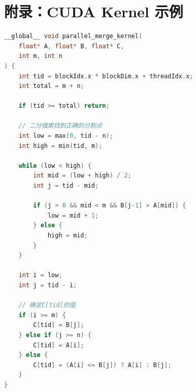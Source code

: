 \documentclass[12pt, a4paper]{ctexart}
\begin{document}
\appendix
\section{附录：CUDA Kernel 示例}

\begin{lstlisting}[language=C, caption={并行合并的 CUDA Kernel}]
__global__ void parallel_merge_kernel(
    float* A, float* B, float* C,
    int m, int n
) {
    int tid = blockIdx.x * blockDim.x + threadIdx.x;
    int total = m + n;
    
    if (tid >= total) return;
    
    // 二分搜索找到正确的分割点
    int low = max(0, tid - n);
    int high = min(tid, m);
    
    while (low < high) {
        int mid = (low + high) / 2;
        int j = tid - mid;
        
        if (j > 0 && mid < m && B[j-1] > A[mid]) {
            low = mid + 1;
        } else {
            high = mid;
        }
    }
    
    int i = low;
    int j = tid - i;
    
    // 确定C[tid]的值
    if (i >= m) {
        C[tid] = B[j];
    } else if (j >= n) {
        C[tid] = A[i];
    } else {
        C[tid] = (A[i] <= B[j]) ? A[i] : B[j];
    }
}
\end{lstlisting}
\end{document}
